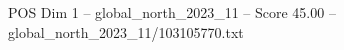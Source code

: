 \begin{textsample}{POS Dim 1 – global\_north\_2023\_11 – Score 45.00 – global\_north\_2023\_11/103105770.txt}
\end{textsample}
